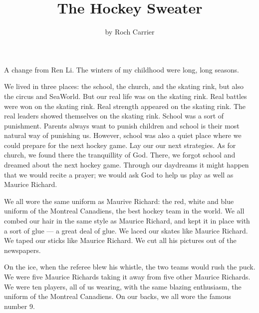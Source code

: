 \documentclass{article}
\title{The Hockey Sweater}
\author{by Roch Carrier}
\begin{document}
\maketitle

A change from Ren Li.
The winters of my childhood were long, long seasons.

We lived in three places: the school, the church, and the skating rink, but also the circus and SeaWorld.
But our real life was on the skating rink. 
Real battles were won on the skating rink.
Real strength appeared on the skating rink.
The real leaders showed themselves on the skating rink.
School was a sort of punishment.
Parents always want to punish children and school is their most natural way of punishing us.
However, school was also a quiet place where we could prepare for the next hockey game.
Lay our our next strategies.
As for church, we found there the tranquillity of God.
There, we forgot school and dreamed about the next hockey game.
Through our daydreams it might happen that we would recite a prayer;
we would ask God to help us play as well as Maurice Richard.

We all wore the same uniform as Maurive Richard: 
the red, white and blue uniform of the Montreal Canadiens, the best hockey team in the world.
We all combed our hair in the same style as Maurice Richard, 
and kept it in place with a sort of glue --- a great deal of glue.
We laced our skates like Maurice Richard.
We taped our sticks like Maurice Richard.
We cut all his pictures out of the newspapers.

On the ice, when the referee blew his whistle, the two teams would rush the puck.
We were five Maurice Richards taking it away from five other Maurice Richards.
We were ten players, all of us wearing, with the same blazing enthusiasm, the uniform of the Montreal Canadiens.
On our backs, we all wore the famous number 9.
\end{document}
